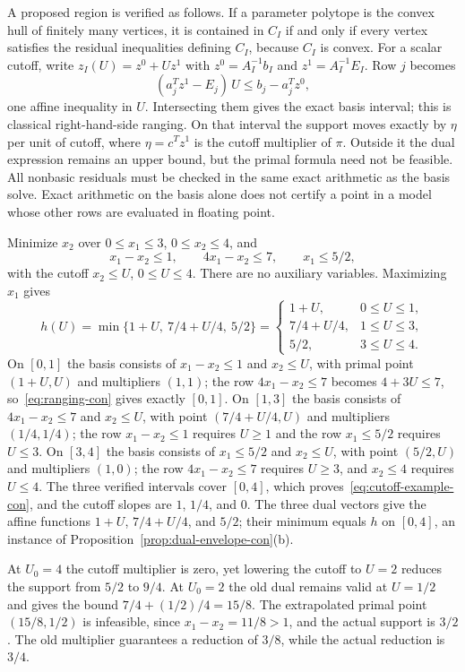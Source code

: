 A proposed region is verified as follows. If a parameter polytope is the
convex hull of finitely many vertices, it is contained in $C_I$ if and only
if every vertex satisfies the residual inequalities defining $C_I$,
because $C_I$ is convex. For a scalar cutoff, write
$z_I(U)=z^0+Uz^1$ with $z^0=A_I^{-1}b_I$ and $z^1=A_I^{-1}E_I$. Row $j$
becomes
\begin{equation}\label{eq:ranging-con}
 (a_j^Tz^1-E_j)\,U\le b_j-a_j^Tz^0,
\end{equation}
one affine inequality in $U$. Intersecting them gives the exact basis
interval; this is classical right-hand-side ranging. On that interval the
support moves exactly by $\eta$ per unit of cutoff, where $\eta=c^Tz^1$ is
the cutoff multiplier of $\pi$. Outside it the dual expression remains an
upper bound, but the primal formula need not be feasible. All nonbasic
residuals must be checked in the same exact arithmetic as the basis solve.
Exact arithmetic on the basis alone does not certify a point in a model whose
other rows are evaluated in floating point.

\begin{example}\label{ex:cutoff-con}
Minimize $x_2$ over $0\le x_1\le3$, $0\le x_2\le4$, and
\[
 x_1-x_2\le1,\qquad 4x_1-x_2\le7,\qquad x_1\le 5/2,
\]
with the cutoff $x_2\le U$, $0\le U\le4$. There are no auxiliary
variables. Maximizing $x_1$ gives
\begin{equation}\label{eq:cutoff-example-con}
 h(U)=\min\{1+U,\ 7/4+U/4,\ 5/2\}
 =\begin{cases}
  1+U,&0\le U\le1,\\
  7/4+U/4,&1\le U\le3,\\
  5/2,&3\le U\le4.
 \end{cases}
\end{equation}
On $[0,1]$ the basis consists of $x_1-x_2\le1$ and $x_2\le U$, with primal
point $(1+U,U)$ and multipliers $(1,1)$; the row $4x_1-x_2\le7$ becomes
$4+3U\le7$, so~\eqref{eq:ranging-con} gives exactly $[0,1]$. On $[1,3]$ the
basis consists of $4x_1-x_2\le7$ and $x_2\le U$, with point $(7/4+U/4,U)$
and multipliers $(1/4,1/4)$; the row $x_1-x_2\le1$ requires $U\ge1$ and the
row $x_1\le5/2$ requires $U\le3$. On $[3,4]$ the basis consists of
$x_1\le5/2$ and $x_2\le U$, with point $(5/2,U)$ and multipliers $(1,0)$;
the row $4x_1-x_2\le7$ requires $U\ge3$, and $x_2\le4$ requires $U\le4$.
The three verified intervals cover $[0,4]$, which
proves~\eqref{eq:cutoff-example-con}, and the cutoff slopes are $1$,
$1/4$, and $0$. The three dual vectors give the affine functions $1+U$,
$7/4+U/4$, and $5/2$; their minimum equals $h$ on $[0,4]$, an instance of
Proposition~\ref{prop:dual-envelope-con}(b).

At $U_0=4$ the cutoff multiplier is zero, yet lowering the cutoff to $U=2$
reduces the support from $5/2$ to $9/4$. At $U_0=2$ the old dual remains
valid at $U=1/2$ and gives the bound $7/4+(1/2)/4=15/8$. The extrapolated
primal point $(15/8,1/2)$ is infeasible, since $x_1-x_2=11/8>1$, and the
actual support is $3/2$. The old multiplier guarantees a reduction of
$3/8$, while the actual reduction is $3/4$.
\end{example}


